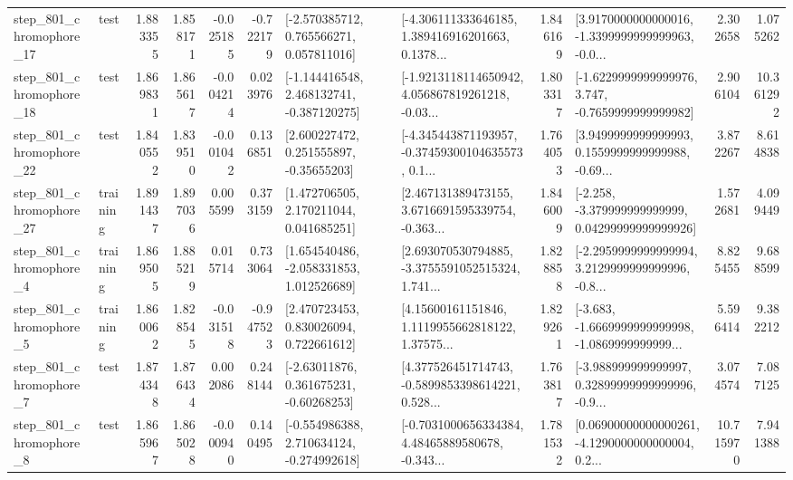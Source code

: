 \begin{tabular}{llrrrrllrlrr}
  step\_801\_chromophore\_17 &      test &      1.883355 &    1.858171 &     -0.025185 & -0.722179 &    [-2.570385712, 0.765566271, 0.057811016] &  [-4.306111333646185, 1.389416916201663, 0.1378... &       1.846169 &  [3.9170000000000016, -1.3399999999999963, -0.0... &            2.302658 &          1.075262 \\
  step\_801\_chromophore\_18 &      test &      1.869831 &    1.865617 &     -0.004214 &  0.023976 &   [-1.144416548, 2.468132741, -0.387120275] &  [-1.9213118114650942, 4.056867819261218, -0.03... &       1.803317 &  [-1.6229999999999976, 3.747, -0.7659999999999982] &            2.906104 &         10.361292 \\
  step\_801\_chromophore\_22 &      test &      1.840552 &    1.839510 &     -0.001042 &  0.136851 &     [2.600227472, 0.251555897, -0.35655203] &  [-4.345443871193957, -0.37459300104635573, 0.1... &       1.764053 &  [3.9499999999999993, 0.1559999999999988, -0.69... &            3.872267 &          8.614838 \\
  step\_801\_chromophore\_27 &  training &      1.891437 &    1.897036 &      0.005599 &  0.373159 &     [1.472706505, 2.170211044, 0.041685251] &  [2.467131389473155, 3.6716691595339754, -0.363... &       1.846009 &  [-2.258, -3.379999999999999, 0.04299999999999926] &            1.572681 &          4.099449 \\
   step\_801\_chromophore\_4 &  training &      1.869505 &    1.885219 &      0.015714 &  0.733064 &    [1.654540486, -2.058331853, 1.012526689] &  [2.693070530794885, -3.3755591052515324, 1.741... &       1.828858 &  [-2.2959999999999994, 3.2129999999999996, -0.8... &            8.825455 &          9.688599 \\
   step\_801\_chromophore\_5 &  training &      1.860062 &    1.828545 &     -0.031518 & -0.947523 &     [2.470723453, 0.830026094, 0.722661612] &  [4.15600161151846, 1.1119955662818122, 1.37575... &       1.829261 &  [-3.683, -1.6669999999999998, -1.0869999999999... &            5.596414 &          9.382212 \\
   step\_801\_chromophore\_7 &      test &      1.874348 &    1.876434 &      0.002086 &  0.248144 &     [-2.63011876, 0.361675231, -0.60268253] &  [4.377526451714743, -0.5899853398614221, 0.528... &       1.763817 &  [-3.988999999999997, 0.32899999999999996, -0.9... &            3.074574 &          7.087125 \\
   step\_801\_chromophore\_8 &      test &      1.865967 &    1.865028 &     -0.000940 &  0.140495 &   [-0.554986388, 2.710634124, -0.274992618] &  [-0.7031000656334384, 4.48465889580678, -0.343... &       1.781532 &  [0.06900000000000261, -4.1290000000000004, 0.2... &           10.715970 &          7.941388 \\

\end{tabular}
